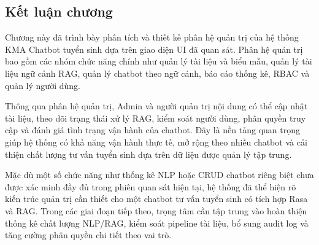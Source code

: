 \subsection{Kết luận chương}

Chương này đã trình bày phân tích và thiết kế phân hệ quản trị của hệ thống KMA Chatbot tuyển sinh dựa trên giao diện UI đã quan sát. Phân hệ quản trị bao gồm các nhóm chức năng chính như quản lý tài liệu và biểu mẫu, quản lý tài liệu ngữ cảnh RAG, quản lý chatbot theo ngữ cảnh, báo cáo thống kê, RBAC và quản lý người dùng.

Thông qua phân hệ quản trị, Admin và người quản trị nội dung có thể cập nhật tài liệu, theo dõi trạng thái xử lý RAG, kiểm soát người dùng, phân quyền truy cập và đánh giá tình trạng vận hành của chatbot. Đây là nền tảng quan trọng giúp hệ thống có khả năng vận hành thực tế, mở rộng theo nhiều chatbot và cải thiện chất lượng tư vấn tuyển sinh dựa trên dữ liệu được quản lý tập trung.

Mặc dù một số chức năng như thống kê NLP hoặc CRUD chatbot riêng biệt chưa được xác minh đầy đủ trong phiên quan sát hiện tại, hệ thống đã thể hiện rõ kiến trúc quản trị cần thiết cho một chatbot tư vấn tuyển sinh có tích hợp Rasa và RAG. Trong các giai đoạn tiếp theo, trọng tâm cần tập trung vào hoàn thiện thống kê chất lượng NLP/RAG, kiểm soát pipeline tài liệu, bổ sung audit log và tăng cường phân quyền chi tiết theo vai trò.
